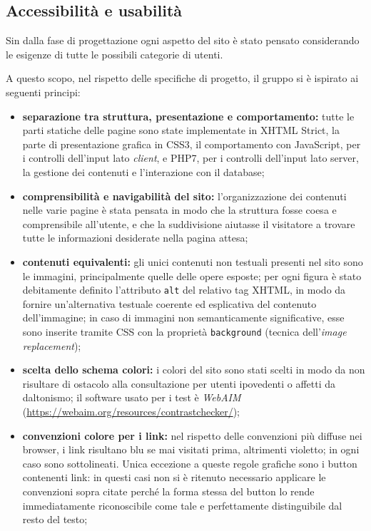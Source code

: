 \subsection{Accessibilità e usabilità}
\label{progettazione-accessibilità-usabilità}
Sin dalla fase di progettazione ogni aspetto del sito è stato pensato considerando le esigenze di tutte le possibili categorie di utenti. 


A questo scopo, nel rispetto delle specifiche di progetto, il gruppo si è ispirato ai seguenti principi:
\begin{itemize}
	\item \textbf{separazione tra struttura, presentazione e comportamento:} tutte le parti statiche delle pagine sono state implementate in XHTML Strict, la parte di presentazione grafica in CSS3, il comportamento con JavaScript, per i controlli dell'input lato \textit{client}, e PHP7, per i controlli dell'input lato server, la gestione dei contenuti e l'interazione con il database;
	
	\item \textbf{comprensibilità e navigabilità del sito:} l'organizzazione dei contenuti nelle varie pagine è stata pensata in modo che la struttura fosse coesa e comprensibile all'utente, e che la suddivisione aiutasse il visitatore a trovare tutte le informazioni desiderate nella pagina attesa;
	
	\item \textbf{contenuti equivalenti:} gli unici contenuti non testuali presenti nel sito sono le immagini, principalmente quelle delle opere esposte; per ogni figura è stato debitamente definito l'attributo \texttt{alt} del relativo tag XHTML, in modo da fornire un'alternativa testuale coerente ed esplicativa del contenuto dell'immagine; in caso di immagini non semanticamente significative, esse sono inserite tramite CSS con la proprietà \texttt{background} (tecnica dell'\textit{image replacement});
	
	\item \textbf{scelta dello schema colori:} i colori del sito sono stati scelti in modo da non risultare di ostacolo alla consultazione per utenti ipovedenti o affetti da daltonismo; il software usato per i test è \textit{WebAIM} (\url{https://webaim.org/resources/contrastchecker/}); 
	
	\item \textbf{convenzioni colore per i link:} nel rispetto delle convenzioni più diffuse nei browser, i link risultano blu se mai visitati prima, altrimenti violetto; in ogni caso sono sottolineati. Unica eccezione a queste regole grafiche sono i button contenenti link: in questi casi non si è ritenuto necessario applicare le convenzioni sopra citate perché la forma stessa del button lo rende immediatamente riconoscibile come tale e perfettamente distinguibile dal resto del testo;
	

\end{itemize}
